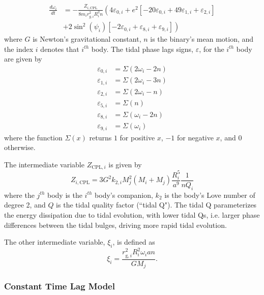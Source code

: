 \documentclass[twocolumn]{aastex61}
\begin{document}
\begin{equation} \label{eqn:cpl:omega}
\begin{split}
\frac{d\omega_i}{dt}& = -\frac{Z_{i,\mathrm{CPL}}}{8m_i r_{g,i}^2 R_i^2 n} \left(4 \varepsilon_{0,i} + e^2\left[-20\varepsilon_{0,i} + 49\varepsilon_{1,i} + \varepsilon_{2,i} \right] \right. \\
& \left. + 2 \sin^2(\psi_i) \left[ -2 \varepsilon_{0,i} + \varepsilon_{8,i} + \varepsilon_{9,i} \right] \right)
\end{split}
\end{equation}
where $G$ is Newton's gravitational constant, $n$ is the binary's mean motion, and the index $i$ denotes that $i^{th}$ body. The tidal phase lags signs, $\varepsilon$, for the $i^{th}$ body are given by
\begin{equation} \label{eqn:cpl:eps}
\begin{split}
\varepsilon_{0,i} & = \Sigma(2 \omega_i - 2n) \\
\varepsilon_{1,i} & = \Sigma(2 \omega_i - 3n) \\
\varepsilon_{2,i} & = \Sigma(2 \omega_i - n) \\
\varepsilon_{5,i} & = \Sigma(n) \\
\varepsilon_{8,i} & = \Sigma(\omega_i - 2n) \\
\varepsilon_{9,i} & = \Sigma(\omega_i)
\end{split}
\end{equation}
where the function $\Sigma(x)$ returns $1$ for positive $x$, $-1$ for negative $x$, and $0$ otherwise.

The intermediate variable $Z_{\mathrm{CPL},i}$ is given by
\begin{equation} \label{eqn:cpl:z}
Z_{i,\mathrm{CPL}} = 3 G^2 k_{2,i} M_j^2 (M_i + M_j) \frac{R_i^5}{a^9} \frac{1}{n Q_i}
\end{equation}
where the $j^{th}$ body is the $i^{th}$ body's companion, $k_{2}$ is the body's Love number of degree 2, and $Q$ is the tidal quality factor (``tidal Q"). The tidal Q parameterizes the energy dissipation due to tidal evolution, with lower tidal Qs, i.e. larger phase differences between the tidal bulges, driving more rapid tidal evolution.

The other intermediate variable, $\xi_i$, is defined as
\begin{equation}\label{eqn:cpl:chi}
\xi_i = \frac{r_{\mathrm{g},i}^2 R_i^2 \omega_i a n }{ G M_j}.
\end{equation}

\subsubsection{Constant Time Lag Model}
\end{document}
